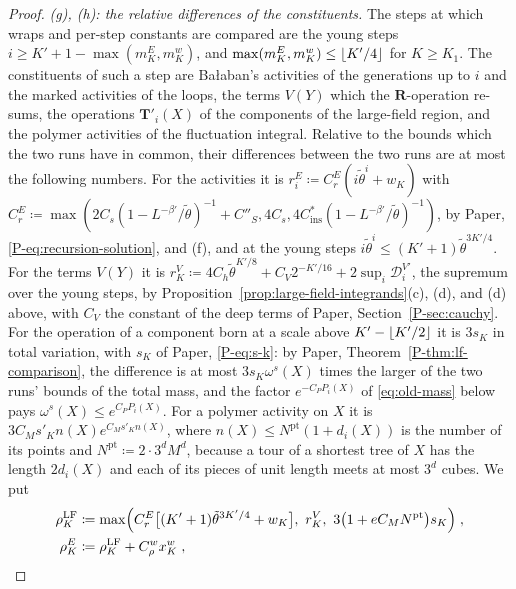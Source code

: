 \documentclass[11pt]{preprint}
\DeclarePairedDelimiter{\floor}{\lfloor}{\rfloor}
\numberwithin{equation}{section}
\theoremstyle{definition}
\theoremstyle{remark}
\theoremstyle{plain}
\begin{document}
\begin{proof}
\emph{(g), (h): the relative differences of the constituents.} The steps at which wraps and per-step constants are compared are the young steps $i \geq K' + 1 - \max(m^E_K, m^w_K)$, and $\max(m^E_K, m^w_K) \leq \floor{K'/4}$ for $K \geq K_1$. The constituents of such a step are Ba{\l}aban's activities of the generations up to $i$ and the marked activities of the loops, the terms $V(Y)$ which the $\mathbf R$-operation re-sums, the operations $\mathbf T'_i(X)$ of the components of the large-field region, and the polymer activities of the fluctuation integral. Relative to the bounds which the two runs have in common, their differences between the two runs are at most the following numbers. For the activities it is $r^E_i \coloneqq C^E_r(i\tilde\theta^i + w_K)$ with $C^E_r \coloneqq \max(2C_s(1 - L^{-\beta'}/\tilde\theta)^{-1} + C''_S, 4C_s, 4C^*_{\mathrm{ins}}(1 - L^{-\beta'}/\tilde\theta)^{-1})$, by Paper, \eqref{P-eq:recursion-solution}, and (f), and at the young steps $i\tilde\theta^i \leq (K' + 1)\tilde\theta^{3K'/4}$. For the terms $V(Y)$ it is $r^V_K \coloneqq 4C_h\tilde\theta^{K'/8} + C_V2^{-K'/16} + 2\sup_i\mathcal D^{V\prime}_i$, the supremum over the young steps, by Proposition~\ref{prop:large-field-integrands}(c), (d), and (d) above, with $C_V$ the constant of the deep terms of Paper, Section~\ref{P-sec:cauchy}. For the operation of a component born at a scale above $K' - \floor{K'/2}$ it is $3s_K$ in total variation, with $s_K$ of Paper, \eqref{P-eq:s-k}: by Paper, Theorem~\ref{P-thm:lf-comparison}, the difference is at most $3s_K\omega^s(X)$ times the larger of the two runs' bounds \cite[(1.79)]{BalabanLFR2} of the total mass, and the factor $e^{-C_PP_i(X)}$ of \eqref{eq:old-mass} below pays $\omega^s(X) \leq e^{C_PP_i(X)}$. For a polymer activity on $X$ it is $3C_Ms'_Kn(X)e^{C_Ms'_Kn(X)}$, where $n(X) \leq N^{\mathrm{pt}}(1 + d_i(X))$ is the number of its points and $N^{\mathrm{pt}} \coloneqq 2\cdot3^dM^d$, because a tour of a shortest tree of $X$ has the length $2d_i(X)$ and each of its pieces of unit length meets at most $3^d$ cubes. We put
\begin{equation}\label{eq:relative-differences}
\begin{aligned}
    \rho^{\mathrm{LF}}_K &\coloneqq \max\Bigl(C^E_r\bigl[(K' + 1)\tilde\theta^{3K'/4} + w_K\bigr],\ r^V_K,\ 3\bigl(1 + eC_MN^{\mathrm{pt}}\bigr)s_K\Bigr)\;,\\
    \rho^E_K &\coloneqq \rho^{\mathrm{LF}}_K + C^w_\rho x^w_K\;,
\end{aligned}
\end{equation}

\end{proof}
\end{document}
